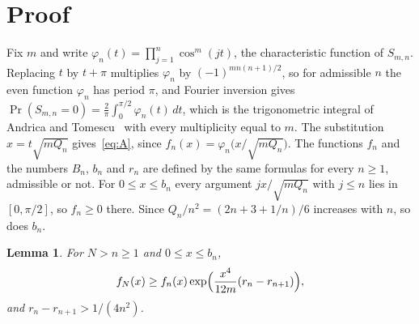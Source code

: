 \documentclass[11pt]{article}
\newtheorem{lemma}[theorem]{Lemma}
\theoremstyle{remark}
\begin{document}
\section{Proof}\label{sec:proof}

Fix $m$ and write $\varphi_n(t)=\prod_{j=1}^n\cos^m(jt)$, the characteristic function of $S_{m,n}$. Replacing $t$ by $t+\pi$ multiplies $\varphi_n$ by $(-1)^{mn(n+1)/2}$, so for admissible $n$ the even function $\varphi_n$ has period $\pi$, and Fourier inversion gives $\Pr(S_{m,n}=0)=\frac{2}{\pi}\int_0^{\pi/2}\varphi_n(t)\,dt$, which is the trigonometric integral of Andrica and Tomescu~\cite[Section~1]{AT02} with every multiplicity equal to $m$. The substitution $x=t\sqrt{mQ_n}$ gives~\eqref{eq:A}, since $f_n(x)=\varphi_n\bigl(x/\sqrt{mQ_n}\bigr)$.
The functions $f_n$ and the numbers $B_n$, $b_n$ and $r_n$ are defined by the same formulas for every $n\ge1$, admissible or not. For $0\le x\le b_n$ every argument $jx/\sqrt{mQ_n}$ with $j\le n$ lies in $[0,\pi/2]$, so $f_n\ge0$ there. Since $Q_n/n^2=(2n+3+1/n)/6$ increases with $n$, so does $b_n$.

\begin{lemma}\label{lem:pointwise}
For $N>n\ge1$ and $0\le x\le b_n$,
\[
f_N(x)\ge f_n(x)\exp\Bigl(\frac{x^4}{12m}(r_n-r_{n+1})\Bigr),
\]
and $r_n-r_{n+1}>1/(4n^2)$.
\end{lemma}
\end{document}

